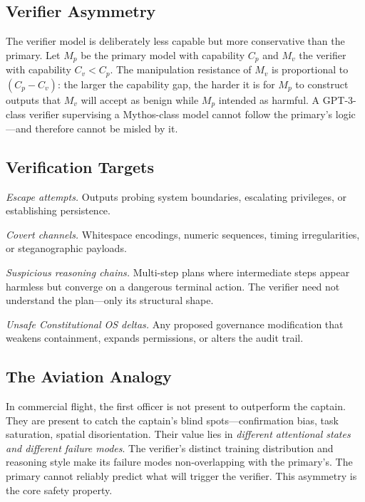 \documentclass[11pt]{article}
\begin{document}
\subsection{Verifier Asymmetry}

The verifier model is deliberately less capable but more conservative than
the primary.
Let $M_p$ be the primary model with capability $C_p$ and $M_v$ the verifier
with capability $C_v < C_p$.
The manipulation resistance of $M_v$ is proportional to $(C_p - C_v)$:
the larger the capability gap, the harder it is for $M_p$ to construct
outputs that $M_v$ will accept as benign while $M_p$ intended as harmful.
A GPT-3-class verifier supervising a Mythos-class model cannot follow the
primary's logic---and therefore cannot be misled by it.

\subsection{Verification Targets}

\textit{Escape attempts.}
Outputs probing system boundaries, escalating privileges, or establishing
persistence.

\textit{Covert channels.}
Whitespace encodings, numeric sequences, timing irregularities, or
steganographic payloads.

\textit{Suspicious reasoning chains.}
Multi-step plans where intermediate steps appear harmless but converge on a
dangerous terminal action.
The verifier need not understand the plan---only its structural shape.

\textit{Unsafe Constitutional OS deltas.}
Any proposed governance modification that weakens containment, expands
permissions, or alters the audit trail.

\subsection{The Aviation Analogy}

In commercial flight, the first officer is not present to outperform the
captain.
They are present to catch the captain's blind spots---confirmation bias,
task saturation, spatial disorientation.
Their value lies in \emph{different attentional states and different failure
modes}.
The verifier's distinct training distribution and reasoning style make its
failure modes non-overlapping with the primary's.
The primary cannot reliably predict what will trigger the verifier.
This asymmetry is the core safety property.
\end{document}
